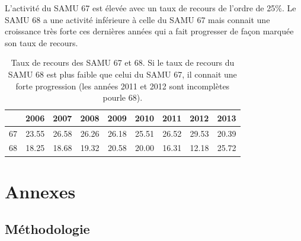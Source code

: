\documentclass[12pt,english,french,twoside]{book}\usepackage[]{graphicx}\usepackage[]{color}
\begin{document}
L'activité du SAMU 67 est élevée avec un taux de recours de l'ordre de 25\%. Le SAMU 68 a une activité inférieure à celle du SAMU 67 mais connait une croissance très forte ces dernières années qui a fait progresser de façon marquée son taux de recours.

\begin{table}[ht]
\centering
\begin{tabular}{rrrrrrrrr}
  \hline
 & 2006 & 2007 & 2008 & 2009 & 2010 & 2011 & 2012 & 2013 \\ 
  \hline
67 & 23.55 & 26.58 & 26.26 & 26.18 & 25.51 & 26.52 & 29.53 & 20.39 \\ 
  68 & 18.25 & 18.68 & 19.32 & 20.58 & 20.00 & 16.31 & 12.18 & 25.72 \\ 
   \hline
\end{tabular}
\caption[Taux de recours des SAMU]{Taux de recours des SAMU 67 et 68. Si le taux de recours du SAMU 68 est plus faible que celui du SAMU 67, il connait une forte progression (les années 2011 et 2012 sont incomplètes pourle 68).} 
\label{fig.rec}
\end{table}






\part{Annexes}

\newpage
\appendix
\chapter{Méthodologie}
\end{document}
